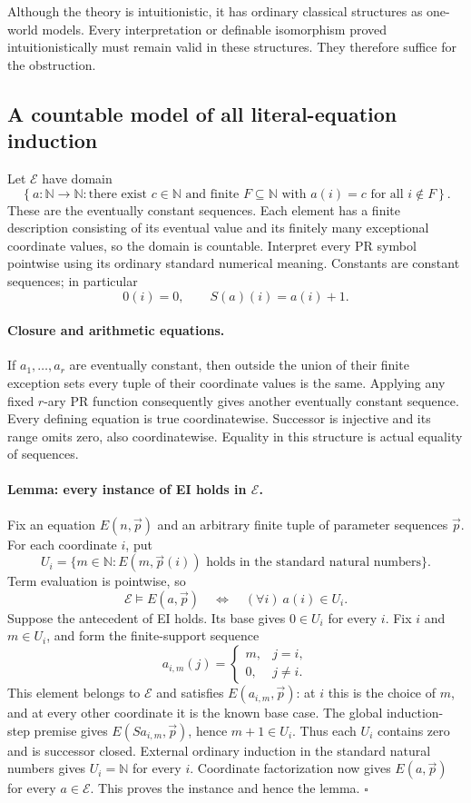 Although the theory is intuitionistic, it has ordinary classical
structures as one-world models.  Every interpretation or definable
isomorphism proved intuitionistically must remain valid in these
structures.  They therefore suffice for the obstruction.

\subsection{A countable model of all literal-equation induction}

Let $\mathcal E$ have domain
\[
 \left\{a:\mathbb N\to\mathbb N:
   \text{there exist }c\in\mathbb N\text{ and finite }F\subseteq\mathbb N
   \text{ with }a(i)=c\text{ for all }i\notin F\right\}.
 \tag{Domain}
\]
These are the eventually constant sequences.  Each element has a
finite description consisting of its eventual value and its finitely
many exceptional coordinate values, so the domain is countable.
Interpret every PR symbol pointwise using its ordinary standard
numerical meaning.  Constants are constant sequences; in particular
\[
 0(i)=0,\qquad S(a)(i)=a(i)+1.
\]

\paragraph{Closure and arithmetic equations.}
If $a_1,\ldots,a_r$ are eventually constant, then outside the union
of their finite exception sets every tuple of their coordinate values
is the same.  Applying any fixed $r$-ary PR function consequently gives
another eventually constant sequence.  Every defining equation is true
coordinatewise.  Successor is injective and its range omits zero,
also coordinatewise.  Equality in this structure is actual equality of
sequences.

\paragraph{Lemma: every instance of EI holds in $\mathcal E$.}
Fix an equation $E(n,\vec p)$ and an arbitrary finite tuple of parameter
sequences $\vec p$.  For each coordinate $i$, put
\[
 U_i=\{m\in\mathbb N:
       E(m,\vec p(i))\text{ holds in the standard natural numbers}\}.
\]
Term evaluation is pointwise, so
\[
 \mathcal E\models E(a,\vec p)
 \quad\Longleftrightarrow\quad
 (\forall i)\ a(i)\in U_i.
 \tag{Coordinate factorization}
\]
Suppose the antecedent of EI holds.  Its base gives $0\in U_i$ for
every $i$.  Fix $i$ and $m\in U_i$, and form the finite-support
sequence
\[
 a_{i,m}(j)=
 \begin{cases}m,&j=i,\\0,&j\ne i.\end{cases}
\]
This element belongs to $\mathcal E$ and satisfies $E(a_{i,m},\vec p)$:
at $i$ this is the choice of $m$, and at every other coordinate it is
the known base case.  The global induction-step premise gives
$E(Sa_{i,m},\vec p)$, hence $m+1\in U_i$.  Thus each $U_i$ contains
zero and is successor closed.  External ordinary induction in the
standard natural numbers gives $U_i=\mathbb N$ for every $i$.
Coordinate factorization now gives $E(a,\vec p)$ for every
$a\in\mathcal E$.  This proves the instance and hence the lemma.
\hfill$\square$

